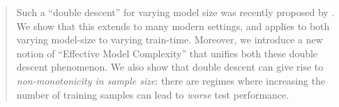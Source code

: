 \begin{abstract}
Such a ``double descent'' for varying model size was recently
proposed by
\cite{belkin2018reconciling}.
We show that this extends to many modern settings,
and applies to both varying model-size to varying train-time.
Moreover, we introduce a new notion of ``Effective Model Complexity''
that unifies both these double descent phenomenon. %
We also show that double descent can give rise to \emph{non-monotonicity in sample size}: there are regimes where increasing the number of training samples can lead to \emph{worse} test performance.
\fi
\end{abstract}